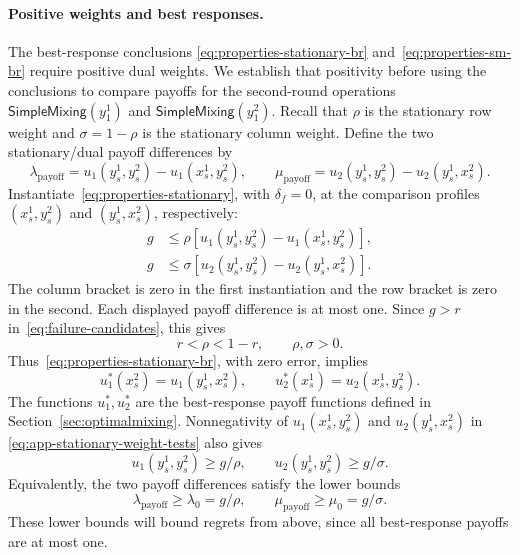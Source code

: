 \documentclass[11pt]{article}
\theoremstyle{remark}
\theoremstyle{plain}
\newcommand{\sm}{\mathsf{SimpleMixing}}
\begin{document}
\paragraph{Positive weights and best responses.}
The best-response conclusions
\eqref{eq:properties-stationary-br} and~\eqref{eq:properties-sm-br}
require positive dual weights. We establish that positivity before
using the conclusions to compare payoffs for the second-round operations
$\sm(y_1^1)$ and $\sm(y_1^2)$.
Recall that $\rho$ is the stationary row weight and $\sigma=1-\rho$
is the stationary column weight.
Define the two stationary/dual payoff differences by
\begin{equation}
 \lambda_{\mathrm{payoff}}=u_1(y_s^1,y_s^2)-u_1(x_s^1,y_s^2),\qquad
 \mu_{\mathrm{payoff}}=u_2(y_s^1,y_s^2)-u_2(y_s^1,x_s^2).
 \label{eq:stationary-payoff-differences}
\end{equation}
Instantiate~\eqref{eq:properties-stationary}, with $\delta_f=0$,
at the comparison profiles $(x_s^1,y_s^2)$ and $(y_s^1,x_s^2)$,
respectively:
\begin{equation}
 \begin{aligned}
 g&\le\rho[u_1(y_s^1,y_s^2)-u_1(x_s^1,y_s^2)],\\
 g&\le\sigma[u_2(y_s^1,y_s^2)-u_2(y_s^1,x_s^2)].
 \end{aligned}
 \label{eq:app-stationary-weight-tests}
\end{equation}
The column bracket is zero in the first instantiation and the row
bracket is zero in the second. Each displayed payoff difference is
at most one. Since $g>r$ in~\eqref{eq:failure-candidates}, this gives
\begin{equation}
 r<\rho<1-r,\qquad \rho,\sigma>0.
 \label{eq:app-positive-stationary-weights}
\end{equation}
Thus~\eqref{eq:properties-stationary-br}, with zero error, implies
\begin{equation}
 u_1^*(x_s^2)=u_1(y_s^1,x_s^2),\qquad
 u_2^*(x_s^1)=u_2(x_s^1,y_s^2).
 \label{eq:app-stationary-best-responses}
\end{equation}
The functions $u_1^*,u_2^*$ are the best-response payoff functions
defined in Section~\ref{sec:optimalmixing}.
Nonnegativity of $u_1(x_s^1,y_s^2)$ and $u_2(y_s^1,x_s^2)$ in
\eqref{eq:app-stationary-weight-tests} also gives
\begin{equation}
 u_1(y_s^1,y_s^2)\ge g/\rho,\qquad
 u_2(y_s^1,y_s^2)\ge g/\sigma.
 \label{eq:app-stationary-payoff-lower-bounds}
\end{equation}
Equivalently, the two payoff differences satisfy the lower bounds
\begin{equation}
 \lambda_{\mathrm{payoff}}\ge\lambda_0=g/\rho,\qquad
 \mu_{\mathrm{payoff}}\ge\mu_0=g/\sigma.
 \label{eq:stationary-gap-lower-values}
\end{equation}
These lower bounds will bound regrets from above, since all
best-response payoffs are at most one.
\end{document}
